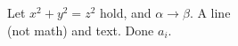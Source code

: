 \documentclass{article}
\begin{document}
Let \(x^2 + y^2 = z^2\) hold, and \(\alpha\to\beta\). A line\\(not math) and text.
Done \(a_i\).
\end{document}
